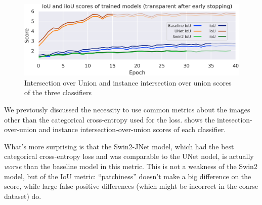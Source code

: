 \begin{figure}
	\centering
	\includegraphics[width=.9\textwidth]{iou_scores.png}
	\caption{Intersection over Union and instance intersection over union scores of the three classifiers}
	\label{comparisons}
\end{figure}

We previously discussed the necessity to use common metrics about the images other than the categorical cross-entropy used for the loss.
 shows the intesection-over-union and instance intersection-over-union scores of each classifier.


What's more surprising is that the Swin2-JNet model, which had the best categorical cross-entropy loss and was comparable to the UNet nodel, is actually \emph{worse} than the baseline model in this metric.
This is not a weakness of the Swin2 model, but of the IoU metric: ``patchiness'' doesn't make a big difference on the score, while large false positive differences (which might be incorrect in the coarse dataset) do.

